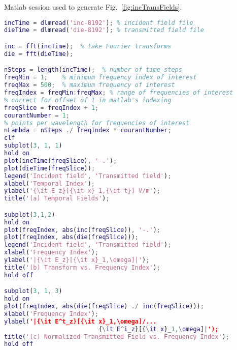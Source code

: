 \begin{program}
Matlab session used to generate Fig.\ \ref{fig:incTransFields}.
 \label{pro:transformFields}
\codemiddle
\begin{lstlisting}[language=Matlab]
incTime = dlmread('inc-8192'); % incident field file
dieTime = dlmread('die-8192'); % transmitted field file

inc = fft(incTime);  % take Fourier transforms
die = fft(dieTime);

nSteps = length(incTime);  % number of time steps
freqMin = 1;    % minimum frequency index of interest
freqMax = 500;  % maximum frequency of interest
freqIndex = freqMin:freqMax; % range of frequencies of interest
% correct for offset of 1 in matlab's indexing
freqSlice = freqIndex + 1;
courantNumber = 1;
% points per wavelength for frequencies of interest
nLambda = nSteps ./ freqIndex * courantNumber;
clf
subplot(3, 1, 1)
hold on
plot(incTime(freqSlice), '-.');
plot(dieTime(freqSlice));
legend('Incident field', 'Transmitted field');
xlabel('Temporal Index');
ylabel('{\it E_z}[{\it x}_1,{\it t}] V/m');
title('(a) Temporal Fields');

subplot(3,1,2)
hold on
plot(freqIndex, abs(inc(freqSlice)), '-.');
plot(freqIndex, abs(die(freqSlice)));
legend('Incident field', 'Transmitted field');
xlabel('Frequency Index');
ylabel('|{\it E_z}[{\it x}_1,\omega]|');
title('(b) Transform vs. Frequency Index');
hold off

subplot(3, 1, 3)
hold on
plot(freqIndex, abs(die(freqSlice) ./ inc(freqSlice)));
xlabel('Frequency Index');
ylabel('|{\it E^t_z}[{\it x}_1,\omega]/...
                          {\it E^i_z}[{\it x}_1,\omega]|');
title('(c) Normalized Transmitted Field vs. Frequency Index');
hold off
\end{lstlisting}
\end{program}

